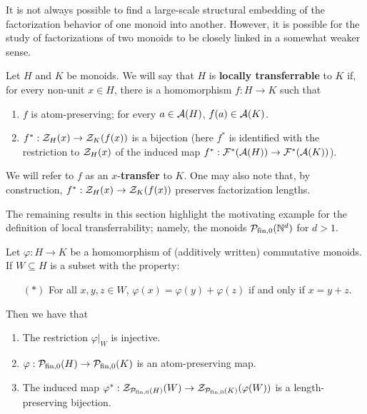 It is not always possible to find a large-scale structural embedding of the factorization behavior of one monoid into another.  
However, it is possible for the study of factorizations of two monoids to be closely linked in a somewhat weaker sense.

\begin{defn} \label{def:local transfer}
Let $H$ and $K$ be monoids. 
We will say that $H$ is \textbf{locally transferrable} to $K$ if, for every non-unit $x\in H$, there is a homomorphism $f: H \to K$ such that 
\begin{enumerate}[label={\rm (\roman{*})}]
	\item $f$ is atom-preserving; for every $a\in \mathcal{A}(H)$, $f(a)\in \mathcal{A}(K)$.
	\item $f^*:\mathcal{Z}_H(x) \to \mathcal{Z}_K(f(x))$ is a bijection (here $f^*$ is identified with the restriction to $\mathcal{Z}_H(x)$ of the induced map $f^*: \mathcal{F}^*(\mathcal{A}(H)) \to \mathcal{F}^*(\mathcal{A}(K))$).
\end{enumerate}
We will refer to $f$ as an $x$-\textbf{transfer} to $K$.
One may also note that, by construction, $f^*:\mathcal{Z}_H(x) \to \mathcal{Z}_K(f(x))$ preserves factorization lengths.
\end{defn}

The remaining results in this section highlight the motivating example for the definition of local transferrability; namely, the monoids $\mathcal{P}_{\textrm{fin}, 0}(\mathbb{N}^d)$ for $d>1$.

\begin{lemma}\label{lem:local-transport}
Let $\varphi: H \to K$ be a homomorphism of (additively written) commutative monoids. 
If $W\subseteq H$ is a subset with the property:
\begin{itemize}
\item[$(*)$] For all $x,y,z\in W$, $\varphi(x) = \varphi(y) + \varphi(z)$ if and only if $x = y + z$.
\end{itemize}
Then we have that
\begin{enumerate}[label={\rm (\roman{*})}]
\item The restriction $\varphi|_W$ is injective.
\item $\varphi:\mathcal{P}_{\textrm{fin}, 0}(H) \to \mathcal{P}_{\textrm{fin}, 0}(K)$ is an atom-preserving map.
\item The induced map $\varphi^*:\mathcal{Z}_{\mathcal{P}_{\textrm{fin}, 0}(H)}(W) \to \mathcal{Z}_{\mathcal{P}_{\textrm{fin}, 0}(K)}(\varphi(W))$ is a length-preserving bijection.
\end{enumerate}
\end{lemma}

